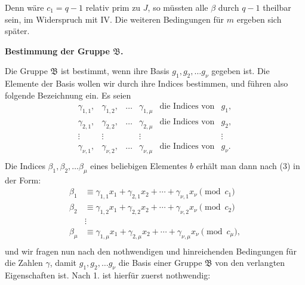 \documentclass[12pt,a4paper]{article}
\begin{document}
Denn wäre $c_1 = q-1$ relativ prim zu $J$, so müssten alle $\beta$
durch $q-1$ theilbar sein, im Widerspruch mit IV. Die weiteren
Bedingungen für $m$ ergeben sich später.

\medskip
\begin{center}\textbf{Bestimmung der Gruppe $\mathfrak{B}$.}\end{center}

Die Gruppe $\mathfrak{B}$ ist bestimmt, wenn ihre Basis $g_1, g_2, \ldots g_\nu$
gegeben ist. Die Elemente der Basis wollen wir durch ihre
Indices bestimmen, und führen also folgende Bezeichnung ein.
Es seien
\[
\begin{array}{cccccc}
\gamma_{1,1}, & \gamma_{1,2}, & \ldots & \gamma_{1,\mu} & \text{die Indices von} & g_1,\\
\gamma_{2,1}, & \gamma_{2,2}, & \ldots & \gamma_{2,\mu} & \text{die Indices von} & g_2,\\
\vdots & \vdots & & \vdots & & \vdots\\
\gamma_{\nu,1}, & \gamma_{\nu,2}, & \ldots & \gamma_{\nu,\mu} & \text{die Indices von} & g_\nu.\\
\end{array}
\]
Die Indices $\beta_1, \beta_2, \ldots \beta_\mu$ eines beliebigen Elementes $b$ erhält
man dann nach (3) in der Form:
\begin{equation}\label{eq:k21-8}
\begin{aligned}
\beta_1 &\equiv \gamma_{1,1} x_1 + \gamma_{2,1} x_2 + \cdots + \gamma_{\nu,1} x_\nu \pmod{c_1}\\
\beta_2 &\equiv \gamma_{1,2} x_1 + \gamma_{2,2} x_2 + \cdots + \gamma_{\nu,2} x_\nu \pmod{c_2}\\
&\vdots\\
\beta_\mu &\equiv \gamma_{1,\mu} x_1 + \gamma_{2,\mu} x_2 + \cdots + \gamma_{\nu,\mu} x_\nu \pmod{c_\mu},\\
\end{aligned}
\end{equation}
und wir fragen nun nach den nothwendigen und hinreichenden
Bedingungen für die Zahlen $\gamma$, damit $g_1, g_2, \ldots g_\nu$ die Basis
einer Gruppe $\mathfrak{B}$ von den verlangten Eigenschaften ist. Nach 1.
ist hierfür zuerst nothwendig:
\end{document}
